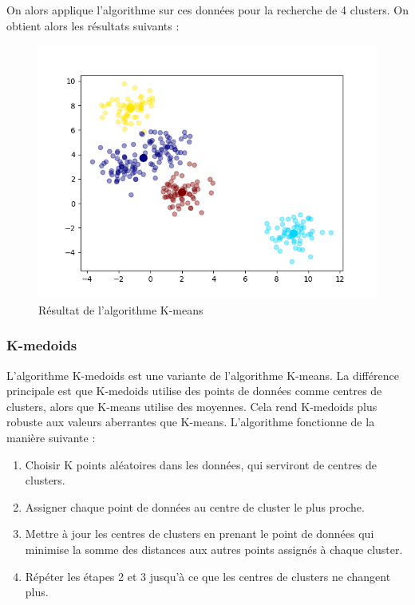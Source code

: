 \documentclass[french,a4paper,18pt]{article}
\begin{document}
On alors applique l'algorithme sur ces données pour la recherche de 4 clusters.
On obtient alors les résultats suivants :
\begin{figure}[h]
    \centering
    \includegraphics[scale=0.5]{images/short_simulation_kmeans.png}
    \caption{Résultat de l'algorithme K-means}\label{fig:short_simulation_kmeans}
\end{figure}

\subsubsection{K-medoids}

L'algorithme K-medoids est une variante de l'algorithme K-means. 
La différence principale est que K-medoids utilise des points de données comme centres de clusters, alors que K-means utilise des moyennes.
Cela rend K-medoids plus robuste aux valeurs aberrantes que K-means.
L'algorithme fonctionne de la manière suivante :
\begin{enumerate}
    \item Choisir K points aléatoires dans les données, qui serviront de centres de clusters.
    \item Assigner chaque point de données au centre de cluster le plus proche.
    \item Mettre à jour les centres de clusters en prenant le point de données qui minimise la somme des distances aux autres points assignés à chaque cluster.
    \item Répéter les étapes 2 et 3 jusqu'à ce que les centres de clusters ne changent plus.
\end{enumerate}
\end{document}
